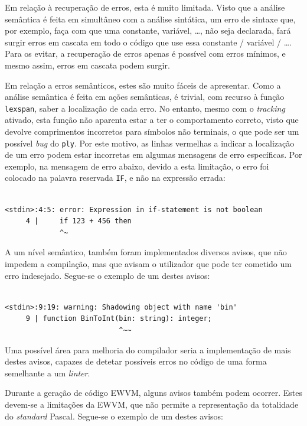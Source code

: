 \documentclass[12pt, a4paper]{article}
\begin{document}
Em relação à recuperação de erros, esta é muito limitada. Visto que a análise semântica é feita em
simultâneo com a análise sintática, um erro de sintaxe que, por exemplo, faça com que uma constante,
variável, \ldots, não seja declarada, fará surgir erros em cascata em todo o código que use essa
constante / variável / \ldots. Para os evitar, a recuperação de erros apenas é possível com erros
mínimos, e mesmo assim, erros em cascata podem surgir.

Em relação a erros semânticos, estes são muito fáceis de apresentar. Como a análise semântica é
feita em ações semânticas, é trivial, com recurso à função \texttt{lexspan}, saber a localização de
cada erro. No entanto, mesmo com o \emph{tracking} ativado, esta função não aparenta estar a ter o
comportamento correto, visto que devolve comprimentos incorretos para símbolos não terminais, o que
pode ser um possível \emph{bug} do \texttt{ply}. Por este motivo, as linhas vermelhas a indicar a
localização de um erro podem estar incorretas em algumas mensagens de erro específicas. Por exemplo,
na mensagem de erro abaixo, devido a esta limitação, o erro foi colocado na palavra reservada
\texttt{IF}, e não na expressão errada:

\begin{lstlisting}

<stdin>:4:5: error: Expression in if-statement is not boolean
     4 |     if 123 + 456 then
             ^~
\end{lstlisting}

A um nível semântico, também foram implementados diversos avisos, que não impedem a compilação, mas
que avisam o utilizador que pode ter cometido um erro indesejado. Segue-se o exemplo de um destes
avisos:


\begin{lstlisting}

<stdin>:9:19: warning: Shadowing object with name 'bin'
     9 | function BinToInt(bin: string): integer;
                           ^~~
\end{lstlisting}

Uma possível área para melhoria do compilador seria a implementação de mais destes avisos, capazes
de detetar possíveis erros no código de uma forma semelhante a um \emph{linter}.

Durante a geração de código EWVM, alguns avisos também podem ocorrer. Estes devem-se a limitações da
EWVM, que não permite a representação da totalidade do \emph{standard} Pascal. Segue-se o exemplo de
um destes avisos:
\end{document}
